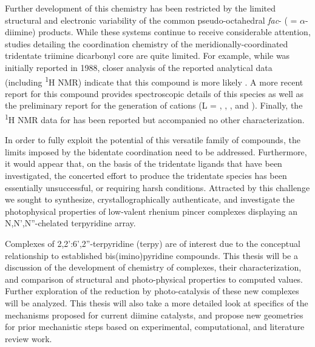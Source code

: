Further development of this chemistry has been restricted by the limited structural and electronic variability of the common pseudo-octahedral \textit{fac}-\ce{[L2ReX(CO)3]} ( = $\alpha$-diimine) products. While these systems continue to receive considerable attention, studies detailing the coordination chemistry of the meridionally-coordinated tridentate triimine  dicarbonyl core are quite limited\autocite{jurca2013}. For example, while  was initially reported in 1988\autocite{juris1988}, closer analysis of the reported analytical data (including \textsuperscript{1}H NMR) indicate that this compound is more likely . A more recent report for this compound provides spectroscopic details of this species as well as the preliminary report for the generation of  cations (L = , , , and )\autocite{black2012}. Finally, the \textsuperscript{1}H NMR data for  has been reported\autocite{abel1993} but accompanied no other characterization.

In order to fully exploit the potential of this versatile family of compounds, the limits imposed by the bidentate coordination need to be addressed. Furthermore, it would appear that, on the basis of the tridentate ligands that have been investigated, the concerted effort to produce the tridentate species has been essentially unsuccessful, or requiring harsh conditions\autocite{potgieter2013}. Attracted by this challenge we sought to synthesize, crystallographically authenticate, and investigate the photophysical properties of low-valent rhenium pincer complexes displaying an N,N',N''-chelated terpyridine array. 

Complexes of 2,2':6',2''-terpyridine (terpy) are of interest due to the conceptual relationship to established bis(imino)pyridine compounds\autocite{russell2010, tondreau2012}. This thesis will be a discussion of the development of chemistry of  complexes, their characterization, and comparison of structural and photo-physical properties to computed values. Further exploration of the  reduction by photo-catalysis of these new complexes will be analyzed. This thesis will also take a more detailed look at specifics of the mechanisms proposed for current  diimine catalysts, and propose new geometries for prior mechanistic steps based on experimental, computational, and literature review work.

